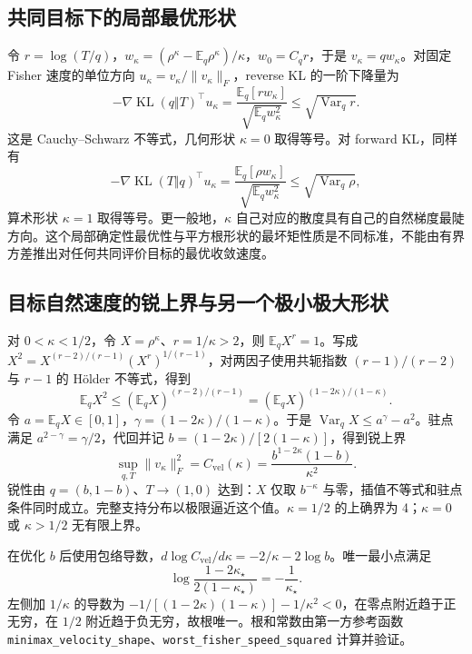 \documentclass[lang=cn,scheme=chinese,openany]{../book/elegantbook}
\newcommand{\E}{\mathbb E}
\newcommand{\KL}{\operatorname{KL}}
\newcommand{\Var}{\operatorname{Var}}
\begin{document}


\subsection{共同目标下的局部最优形状}

令 $r=\log(T/q)$，$w_\kappa=(\rho^\kappa-\E_q\rho^\kappa)/\kappa$，$w_0=C_qr$，于是 $v_\kappa=qw_\kappa$。对固定 Fisher 速度的单位方向 $u_\kappa=v_\kappa/\|v_\kappa\|_F$，reverse KL 的一阶下降量为
\begin{equation}
 -\nabla\KL(q\Vert T)^\top u_\kappa
 =\frac{\E_q[rw_\kappa]}{\sqrt{\E_qw_\kappa^2}}
 \le\sqrt{\Var_qr}.
\end{equation}
这是 Cauchy--Schwarz 不等式，几何形状 $\kappa=0$ 取得等号。对 forward KL，同样有
\begin{equation}
 -\nabla\KL(T\Vert q)^\top u_\kappa
 =\frac{\E_q[\rho w_\kappa]}{\sqrt{\E_qw_\kappa^2}}
 \le\sqrt{\Var_q\rho},
\end{equation}
算术形状 $\kappa=1$ 取得等号。更一般地，$\kappa$ 自己对应的散度具有自己的自然梯度最陡方向。这个局部确定性最优性与平方根形状的最坏矩性质是不同标准，不能由有界方差推出对任何共同评价目标的最优收敛速度。
\subsection{目标自然速度的锐上界与另一个极小极大形状}

对 $0<\kappa<1/2$，令 $X=\rho^\kappa$、$r=1/\kappa>2$，则 $\E_qX^r=1$。写成 $X^2=X^{(r-2)/(r-1)}(X^r)^{1/(r-1)}$，对两因子使用共轭指数 $(r-1)/(r-2)$ 与 $r-1$ 的 Hölder 不等式，得到
\begin{equation}
 \E_qX^2\le(\E_qX)^{(r-2)/(r-1)}
 =(\E_qX)^{(1-2\kappa)/(1-\kappa)}.
\end{equation}
令 $a=\E_qX\in[0,1]$，$\gamma=(1-2\kappa)/(1-\kappa)$。于是 $\Var_qX\le a^\gamma-a^2$。驻点满足 $a^{2-\gamma}=\gamma/2$，代回并记 $b=(1-2\kappa)/[2(1-\kappa)]$，得到锐上界
\begin{equation}
 \boxed{\sup_{q,T}\|v_\kappa\|_F^2
 =C_{\mathrm{vel}}(\kappa)
 =\frac{b^{1-2\kappa}(1-b)}{\kappa^2}}.
\end{equation}
锐性由 $q=(b,1-b)$、$T\to(1,0)$ 达到：$X$ 仅取 $b^{-\kappa}$ 与零，插值不等式和驻点条件同时成立。完整支持分布以极限逼近这个值。$\kappa=1/2$ 的上确界为 4；$\kappa=0$ 或 $\kappa>1/2$ 无有限上界。

在优化 $b$ 后使用包络导数，$d\log C_{\mathrm{vel}}/d\kappa=-2/\kappa-2\log b$。唯一最小点满足
\begin{equation}
 \log\frac{1-2\kappa_\star}{2(1-\kappa_\star)}=-\frac1{\kappa_\star}.
\end{equation}
左侧加 $1/\kappa$ 的导数为 $-1/[(1-2\kappa)(1-\kappa)]-1/\kappa^2<0$，在零点附近趋于正无穷，在 $1/2$ 附近趋于负无穷，故根唯一。根和常数由第一方参考函数 \texttt{minimax\_velocity\_shape}、\texttt{worst\_fisher\_speed\_squared} 计算并验证。
\end{document}
